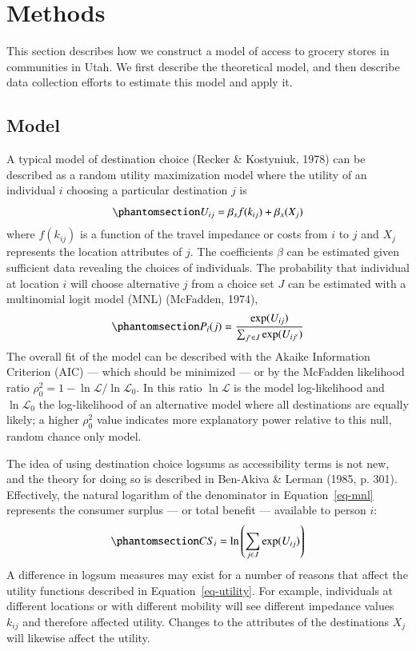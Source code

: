 \documentclass[
  letterpaper,
  number,
  review,
  3p]{elsarticle}
\begin{document}

\section{Methods}\label{sec-methods}

This section describes how we construct a model of access to grocery
stores in communities in Utah. We first describe the theoretical model,
and then describe data collection efforts to estimate this model and
apply it.

\subsection{Model}\label{model}

A typical model of destination choice (Recker \& Kostyniuk, 1978) can be
described as a random utility maximization model where the utility of an
individual \(i\) choosing a particular destination \(j\) is
\begin{equation}\phantomsection\label{eq-utility}{
 U_{ij} = \beta_{s}f(k_{ij}) + \beta_{x}(X_j) 
}\end{equation} where \(f(k_{ij})\) is a function of the travel
impedance or costs from \(i\) to \(j\) and \(X_{j}\) represents the
location attributes of \(j\). The coefficients \(\beta\) can be
estimated given sufficient data revealing the choices of individuals.
The probability that individual at location \(i\) will choose
alternative \(j\) from a choice set \(J\) can be estimated with a
multinomial logit model (MNL) (McFadden, 1974),
\begin{equation}\phantomsection\label{eq-mnl}{ 
P_i(j) = \frac{\exp(U_{ij})}{\sum_{j' \in J}{\exp(U_{ij'})}}
}\end{equation} The overall fit of the model can be described with the
Akaike Information Criterion (AIC) --- which should be minimized --- or
by the McFadden likelihood ratio
\(\rho^2_0 = 1 - \ln\mathcal{L} / \ln\mathcal{L}_0\). In this ratio
\(\ln{\mathcal{L}}\) is the model log-likelihood and
\(\ln{\mathcal{L}_0}\) the log-likelihood of an alternative model where
all destinations are equally likely; a higher \(\rho^2_0\) value
indicates more explanatory power relative to this null, random chance
only model.

The idea of using destination choice logsums as accessibility terms is
not new, and the theory for doing so is described in Ben-Akiva \& Lerman
(1985, p. 301). Effectively, the natural logarithm of the denominator in
Equation~\ref{eq-mnl} represents the consumer surplus --- or total
benefit --- available to person \(i\):
\begin{equation}\phantomsection\label{eq-cs}{ 
CS_i = \ln\left(\sum_{j \in J} \exp(U_{ij})\right)
}\end{equation} A difference in logsum measures may exist for a number
of reasons that affect the utility functions described in
Equation~\ref{eq-utility}. For example, individuals at different
locations or with different mobility will see different impedance values
\(k_{ij}\) and therefore affected utility. Changes to the attributes of
the destinations \(X_j\) will likewise affect the utility.
\end{document}
